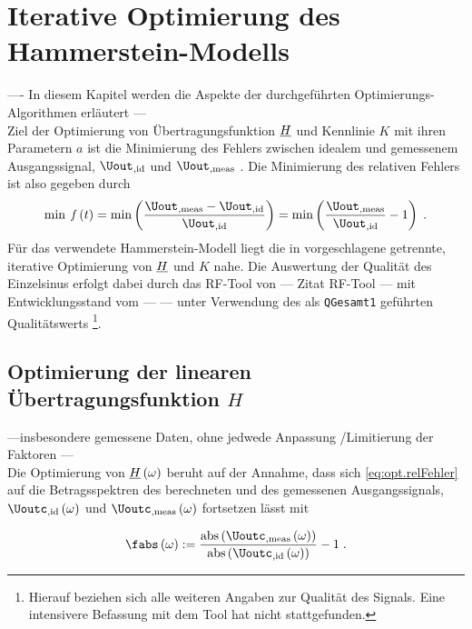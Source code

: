 \documentclass[../Report.tex]{subfiles}
\begin{document}
\chapter{Iterative Optimierung des Hammerstein-Modells}
\label{chap:opt}
---- In diesem Kapitel werden die Aspekte der durchgeführten Optimierungs-Algorithmen erläutert --- \\
Ziel der Optimierung von Übertragungsfunktion $\underline{H}$ und Kennlinie $K$ mit ihren Parametern $a$ ist die Minimierung des Fehlers zwischen idealem und gemessenem Ausgangssignal, $\Uout_{, \mathrm{id}}$ und $\Uout_{, \mathrm{meas}}$ . Die Minimierung des relativen Fehlers ist also gegeben durch
\begin{align}
\label{eq:opt.relFehler}
	\min \; \mathit{f} \oft = \min \left( \frac{\Uout_{, \mathrm{meas}}  - \Uout_{, \mathrm{id}} }{ \Uout_{, \mathrm{id}} } \right) 
	= \min \left( \frac{ \Uout_{, \mathrm{meas}}}{ \Uout_{, \mathrm{id}}} -1 \right) 
	\; .
\end{align}
Für das verwendete Hammerstein-Modell liegt die in \cite{----Jens---} %
vorgeschlagene getrennte, iterative Optimierung von $\underline{H}$ und $K$ nahe. 
Die Auswertung der Qualität des Einzelsinus erfolgt dabei durch das RF-Tool von --- Zitat RF-Tool --- mit Entwicklungsstand vom --- --- unter Verwendung des als \lstinline{QGesamt1} geführten Qualitätswerts \footnote{\label{foot:opt.H.quality}Hierauf beziehen sich alle weiteren Angaben zur Qualität des Signals. Eine intensivere Befassung mit dem Tool hat nicht stattgefunden.}.




\section{Optimierung der linearen Übertragungsfunktion $H$}
\label{sec:opt.H}
---insbesondere gemessene Daten, ohne jedwede Anpassung /Limitierung der Faktoren --- \\

Die Optimierung von $\underline{H} \left( \omega \right)$ beruht auf der Annahme, dass sich \eqref{eq:opt.relFehler} auf die Betragsspektren des berechneten und des gemessenen Ausgangssignals, $\Uoutc_{, \mathrm{id}} \ofomega $ und $\Uoutc_{, \mathrm{meas}} \ofomega $ fortsetzen lässt mit 

\begin{align}
\label{eq:opt.ratio}
	\fabs \ofomega :=  
				\frac{\mathrm{abs} \left( \Uoutc_{, \mathrm{meas}} \ofomega \right)}{\mathrm{abs} \left(\Uoutc_{, \mathrm{id}} \ofomega \right)} -1
				\; .
\end{align} 
\end{document}

